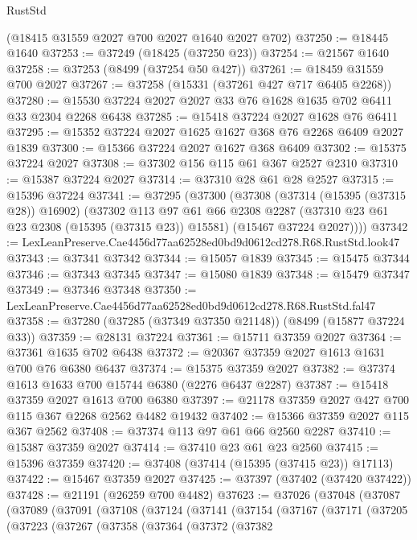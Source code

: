 \begin{lexlean}{RustStd}
\begin{coremodule}
    (@18415 @31559 @2027 @700 @2027 @1640 @2027 @702)
@37250 := @18445 @1640
@37253 := @37249 (@18425 (@37250 @23))
@37254 := @21567 @1640
@37258 := @37253 (@8499 (@37254 @50 @427))
@37261 := @18459 @31559 @700 @2027
@37267 := @37258 (@15331 (@37261 @427 @717 @6405 @2268))
@37280 := @15530 @37224 @2027 @2027 @33 @76 @1628 @1635 @702 @6411 @33 @2304 @2268 @6438
@37285 := @15418 @37224 @2027 @1628 @76 @6411
@37295 := @15352 @37224 @2027 @1625 @1627 @368 @76 @2268 @6409 @2027 @1839
@37300 := @15366 @37224 @2027 @1627 @368 @6409
@37302 := @15375 @37224 @2027
@37308 := @37302 @156 @115 @61 @367 @2527 @2310
@37310 := @15387 @37224 @2027
@37314 := @37310 @28 @61 @28 @2527
@37315 := @15396 @37224
@37341 := @37295
    (@37300
      (@37308
        (@37314 (@15395 (@37315 @28)) @16902)
        (@37302
          @113
          @97
          @61
          @66
          @2308
          @2287
          (@37310 @23 @61 @23 @2308 (@15395 (@37315 @23)) @15581)
          (@15467 @37224 @2027))))
@37342 := LexLeanPreserve.Cae4456d77aa62528ed0bd9d0612cd278.R68.RustStd.look47
@37343 := @37341 @37342
@37344 := @15057 @1839
@37345 := @15475 @37344
@37346 := @37343 @37345
@37347 := @15080 @1839
@37348 := @15479 @37347
@37349 := @37346 @37348
@37350 := LexLeanPreserve.Cae4456d77aa62528ed0bd9d0612cd278.R68.RustStd.fal47
@37358 := @37280 (@37285 (@37349 @37350 @21148)) (@8499 (@15877 @37224 @33))
@37359 := @28131 @37224
@37361 := @15711 @37359 @2027
@37364 := @37361 @1635 @702 @6438
@37372 := @20367 @37359 @2027 @1613 @1631 @700 @76 @6380 @6437
@37374 := @15375 @37359 @2027
@37382 := @37374 @1613 @1633 @700 @15744 @6380 (@2276 @6437 @2287)
@37387 := @15418 @37359 @2027 @1613 @700 @6380
@37397 := @21178 @37359 @2027 @427 @700 @115 @367 @2268 @2562 @4482 @19432
@37402 := @15366 @37359 @2027 @115 @367 @2562
@37408 := @37374 @113 @97 @61 @66 @2560 @2287
@37410 := @15387 @37359 @2027
@37414 := @37410 @23 @61 @23 @2560
@37415 := @15396 @37359
@37420 := @37408 (@37414 (@15395 (@37415 @23)) @17113)
@37422 := @15467 @37359 @2027
@37425 := @37397 (@37402 (@37420 @37422))
@37428 := @21191 (@26259 @700 @4482)
@37623 := @37026
    (@37048
      (@37087
        (@37089
          (@37091
            (@37108
              (@37124
                (@37141
                  (@37154
                    (@37167
                      (@37171
                        (@37205
                          (@37223
                            (@37267
                              (@37358
                                (@37364
                                  (@37372
                                    (@37382

\end{coremodule}
\end{lexlean}
